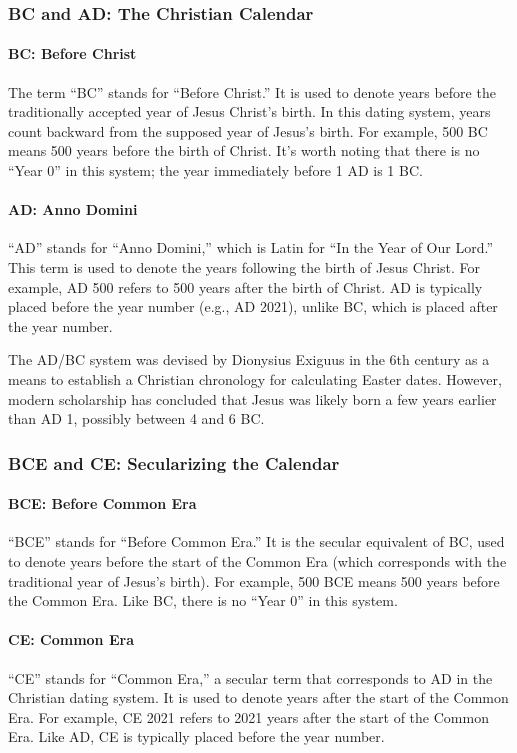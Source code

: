\documentclass[a4paper,12pt]{book}
\begin{document}
\subsubsection*{BC and AD: The Christian Calendar}
\paragraph{BC: Before Christ}
The term ``BC'' stands for ``Before Christ.'' It is used to denote years before the traditionally accepted year of Jesus Christ’s birth. In this dating system, years count backward from the supposed year of Jesus’s birth. For example, 500 BC means 500 years before the birth of Christ. It’s worth noting that there is no ``Year 0'' in this system; the year immediately before 1 AD is 1 BC.

\paragraph{AD: Anno Domini}
``AD'' stands for ``Anno Domini,'' which is Latin for ``In the Year of Our Lord.'' This term is used to denote the years following the birth of Jesus Christ. For example, AD 500 refers to 500 years after the birth of Christ. AD is typically placed before the year number (e.g., AD 2021), unlike BC, which is placed after the year number.

The AD/BC system was devised by Dionysius Exiguus in the 6th century as a means to establish a Christian chronology for calculating Easter dates. However, modern scholarship has concluded that Jesus was likely born a few years earlier than AD 1, possibly between 4 and 6 BC.

\subsubsection*{BCE and CE: Secularizing the Calendar}
\paragraph{BCE: Before Common Era}
``BCE'' stands for ``Before Common Era.'' It is the secular equivalent of BC, used to denote years before the start of the Common Era (which corresponds with the traditional year of Jesus’s birth). For example, 500 BCE means 500 years before the Common Era. Like BC, there is no ``Year 0'' in this system.

\paragraph{CE: Common Era}
``CE'' stands for ``Common Era,'' a secular term that corresponds to AD in the Christian dating system. It is used to denote years after the start of the Common Era. For example, CE 2021 refers to 2021 years after the start of the Common Era. Like AD, CE is typically placed before the year number.
\end{document}
